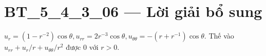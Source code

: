 \documentclass[10pt,a4paper]{article}
\begin{document}
\section*{BT\_5\_4\_3\_06 — Lời giải bổ sung}
$u_r=(1-r^{-2})\cos\theta,u_{rr}=2r^{-3}\cos\theta,u_{\theta\theta}=-(r+r^{-1})\cos\theta$. Thế vào $u_{rr}+u_r/r+u_{\theta\theta}/r^2$ được 0 với $r>0$.
\end{document}
